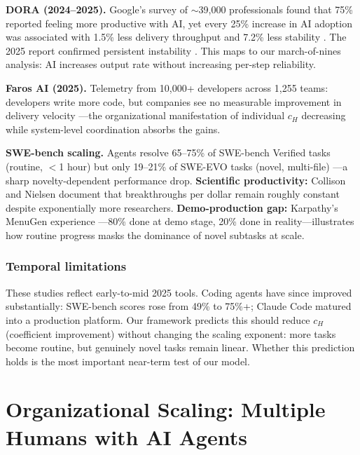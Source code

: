 \documentclass[11pt,a4paper]{article}
\begin{document}
\textbf{DORA (2024--2025).} Google's survey of $\sim$39,000 professionals found that 75\% reported feeling more productive with AI, yet every 25\% increase in AI adoption was associated with 1.5\% less delivery throughput and 7.2\% less stability \citep{dora2024}. The 2025 report confirmed persistent instability \citep{dora2025}. This maps to our march-of-nines analysis: AI increases output rate without increasing per-step reliability.

\textbf{Faros AI (2025).} Telemetry from 10,000+ developers across 1,255 teams: developers write more code, but companies see no measurable improvement in delivery velocity \citep{faros2025}---the organizational manifestation of individual $c_H$ decreasing while system-level coordination absorbs the gains.

\textbf{SWE-bench scaling.} Agents resolve 65--75\% of SWE-bench Verified tasks (routine, $<$1 hour) but only 19--21\% of SWE-EVO tasks (novel, multi-file) \citep{jimenez2024}---a sharp novelty-dependent performance drop. \textbf{Scientific productivity:} Collison and Nielsen \citep{collison2018} document that breakthroughs per dollar remain roughly constant despite exponentially more researchers. \textbf{Demo-production gap:} Karpathy's MenuGen experience \citep{karpathy2025verify}---80\% done at demo stage, 20\% done in reality---illustrates how routine progress masks the dominance of novel subtasks at scale.

\subsubsection*{Temporal limitations}

These studies reflect early-to-mid 2025 tools. Coding agents have since improved substantially: SWE-bench scores rose from 49\% to 75\%+; Claude Code matured into a production platform. Our framework predicts this should reduce $c_H$ (coefficient improvement) without changing the scaling exponent: more tasks become routine, but genuinely novel tasks remain linear. Whether this prediction holds is the most important near-term test of our model.

\section{Organizational Scaling: Multiple Humans with AI Agents}
\label{sec:org}
\end{document}
